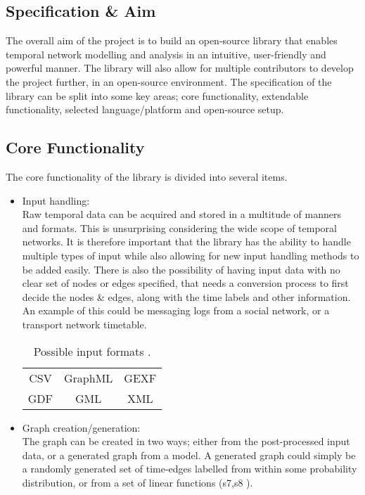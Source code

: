 \begin{specification}
\section{Specification \& Aim}
The overall aim of the project is to build an open-source library that enables temporal network modelling and analysis in an intuitive, user-friendly and powerful manner. The library will also allow for multiple contributors to develop the project further, in an open-source environment. The specification of the library can be split into some key areas; core functionality, extendable functionality, selected language/platform and open-source setup.

\subsection{Core Functionality}
The core functionality of the library is divided into several items.
\begin{itemize}
    \item Input handling:\\
    Raw temporal data can be acquired and stored in a multitude of manners and formats. This is unsurprising considering the wide scope of temporal networks. It is therefore important that the library has the ability to handle multiple types of input while also allowing for new input handling methods to be added easily. There is also the possibility of having input data with no clear set of nodes or edges specified, that needs a conversion process to first decide the nodes \& edges, along with the time labels and other information. An example of this could be messaging logs from a social network, or a transport network timetable.
    \begin{table}[h!]
    \centering
        \begin{tabular}{ |c c c| }
        \hline
        CSV & GraphML & GEXF \\
        GDF & GML & XML \\
        \hline
        \end{tabular}
        \caption{Possible input formats \cite{graph_formats}.}
    \end{table}
    \item Graph creation/generation:\\
    The graph can be created in two ways; either from the post-processed input data, or a generated graph from a model. A generated graph could simply be a randomly generated set of time-edges labelled from within some probability distribution, or from a set of linear functions (s7,s8 \cite{intro_temporal}).

\end{itemize}
\end{specification}
